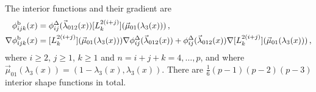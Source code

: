 The interior functions and their gradient are
\begin{equation}
	\begin{aligned}
		\phi_{ijk}^\mathrm{b}(x)&=\phi_{ij}^\Delta(\vec{\lambda}_{012}(x))[L_k^{2(i+j)}](\vec{\mu}_{01}(\lambda_3(x)))\,,\\
			\nabla\phi_{ijk}^\mathrm{b}(x)&=[L_k^{2(i+j)}](\vec{\mu}_{01}(\lambda_3(x)))\nabla\phi_{ij}^\Delta(\vec{\lambda}_{012}(x))
				+\phi_{ij}^\Delta(\vec{\lambda}_{012}(x))\nabla[L_k^{2(i+j)}](\vec{\mu}_{01}(\lambda_3(x)))\,,
	\end{aligned}
\end{equation}
where $i\geq2$, $j\geq1$, $k\geq1$ and $n=i+j+k=4,\ldots,p$, and where $\vec{\mu}_{01}(\lambda_3(x))=(1-\lambda_3(x),\lambda_3(x))$.
There are $\frac{1}{6}(p-1)(p-2)(p-3)$ interior shape functions in total.



